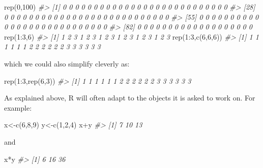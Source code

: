\documentclass[
]{book}
\newenvironment{Shaded}{\begin{snugshade}}{\end{snugshade}}
\newcommand{\CommentTok}[1]{\textcolor[rgb]{0.56,0.35,0.01}{\textit{#1}}}
\newcommand{\DecValTok}[1]{\textcolor[rgb]{0.00,0.00,0.81}{#1}}
\newcommand{\FunctionTok}[1]{\textcolor[rgb]{0.00,0.00,0.00}{#1}}
\newcommand{\NormalTok}[1]{#1}
\newcommand{\OtherTok}[1]{\textcolor[rgb]{0.56,0.35,0.01}{#1}}
\newcommand{\SpecialCharTok}[1]{\textcolor[rgb]{0.00,0.00,0.00}{#1}}
\begin{document}
\begin{Shaded}
\begin{Highlighting}[]
\FunctionTok{rep}\NormalTok{(}\DecValTok{0}\NormalTok{,}\DecValTok{100}\NormalTok{)}
\CommentTok{\#\textgreater{}   [1] 0 0 0 0 0 0 0 0 0 0 0 0 0 0 0 0 0 0 0 0 0 0 0 0 0 0 0}
\CommentTok{\#\textgreater{}  [28] 0 0 0 0 0 0 0 0 0 0 0 0 0 0 0 0 0 0 0 0 0 0 0 0 0 0 0}
\CommentTok{\#\textgreater{}  [55] 0 0 0 0 0 0 0 0 0 0 0 0 0 0 0 0 0 0 0 0 0 0 0 0 0 0 0}
\CommentTok{\#\textgreater{}  [82] 0 0 0 0 0 0 0 0 0 0 0 0 0 0 0 0 0 0 0}
\FunctionTok{rep}\NormalTok{(}\DecValTok{1}\SpecialCharTok{:}\DecValTok{3}\NormalTok{,}\DecValTok{6}\NormalTok{)}
\CommentTok{\#\textgreater{}  [1] 1 2 3 1 2 3 1 2 3 1 2 3 1 2 3 1 2 3}
\FunctionTok{rep}\NormalTok{(}\DecValTok{1}\SpecialCharTok{:}\DecValTok{3}\NormalTok{,}\FunctionTok{c}\NormalTok{(}\DecValTok{6}\NormalTok{,}\DecValTok{6}\NormalTok{,}\DecValTok{6}\NormalTok{))}
\CommentTok{\#\textgreater{}  [1] 1 1 1 1 1 1 2 2 2 2 2 2 3 3 3 3 3 3}
\end{Highlighting}
\end{Shaded}

which we could also simplify cleverly as:

\begin{Shaded}
\begin{Highlighting}[]
\FunctionTok{rep}\NormalTok{(}\DecValTok{1}\SpecialCharTok{:}\DecValTok{3}\NormalTok{,}\FunctionTok{rep}\NormalTok{(}\DecValTok{6}\NormalTok{,}\DecValTok{3}\NormalTok{))}
\CommentTok{\#\textgreater{}  [1] 1 1 1 1 1 1 2 2 2 2 2 2 3 3 3 3 3 3}
\end{Highlighting}
\end{Shaded}

As explained above, R will often adapt to the objects it is asked to work on. For example:

\begin{Shaded}
\begin{Highlighting}[]
\NormalTok{x}\OtherTok{\textless{}{-}}\FunctionTok{c}\NormalTok{(}\DecValTok{6}\NormalTok{,}\DecValTok{8}\NormalTok{,}\DecValTok{9}\NormalTok{)}
\NormalTok{y}\OtherTok{\textless{}{-}}\FunctionTok{c}\NormalTok{(}\DecValTok{1}\NormalTok{,}\DecValTok{2}\NormalTok{,}\DecValTok{4}\NormalTok{)}
\NormalTok{x}\SpecialCharTok{+}\NormalTok{y}
\CommentTok{\#\textgreater{} [1]  7 10 13}
\end{Highlighting}
\end{Shaded}

and

\begin{Shaded}
\begin{Highlighting}[]
\NormalTok{x}\SpecialCharTok{*}\NormalTok{y}
\CommentTok{\#\textgreater{} [1]  6 16 36}
\end{Highlighting}
\end{Shaded}
\end{document}
